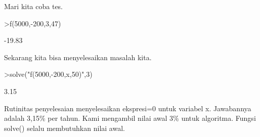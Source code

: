 \documentclass[a4paper,10pt]{article}
\begin{document}
\begin{eulernotebook}
\begin{eulercomment}
\begin{eulercomment}
\begin{eulercomment}
\begin{eulercomment}
\begin{eulercomment}
\begin{eulercomment}
\begin{eulercomment}
\begin{eulercomment}
\begin{eulercomment}
\begin{eulercomment}
\begin{eulercomment}
\begin{eulercomment}
\begin{eulercomment}
Mari kita coba tes.
\end{eulercomment}
\begin{eulerprompt}
>f(5000,-200,3,47)
\end{eulerprompt}
\begin{euleroutput}
       -19.83 
\end{euleroutput}
\begin{eulercomment}
Sekarang kita bisa menyelesaikan masalah kita.
\end{eulercomment}
\begin{eulerprompt}
>solve("f(5000,-200,x,50)",3)
\end{eulerprompt}
\begin{euleroutput}
         3.15 
\end{euleroutput}
\begin{eulercomment}
Rutinitas penyelesaian menyelesaikan ekspresi=0 untuk variabel x.
Jawabannya adalah 3,15\% per tahun. Kami mengambil nilai awal 3\% untuk
algoritma. Fungsi solve() selalu membutuhkan nilai awal.


\end{eulercomment}
\end{eulercomment}
\end{eulercomment}
\end{eulercomment}
\end{eulercomment}
\end{eulercomment}
\end{eulercomment}
\end{eulercomment}
\end{eulercomment}
\end{eulercomment}
\end{eulercomment}
\end{eulercomment}
\end{eulercomment}
\end{eulernotebook}
\end{document}
